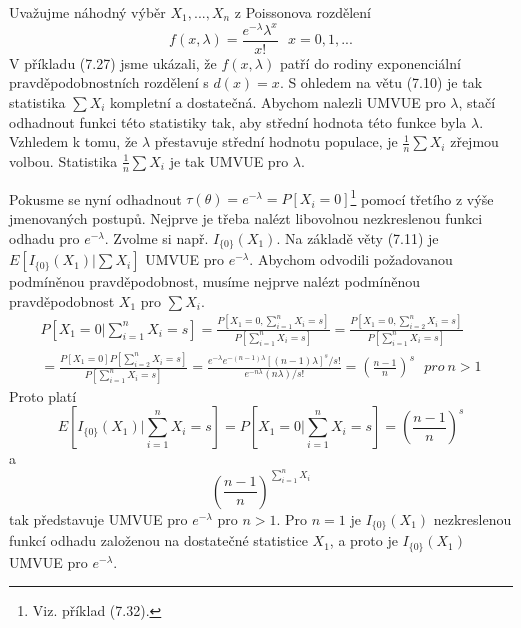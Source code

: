 \begin{example}
Uvažujme náhodný výběr $X_1, ..., X_n$ z Poissonova rozdělení
\begin{equation*}
f(x, \lambda) = \frac{e^{-\lambda}\lambda^x}{x!} ~~~ x = 0, 1, ...
\end{equation*}
V příkladu (7.27) jsme ukázali, že $f(x, \lambda)$ patří do rodiny exponenciální pravděpodobnostních rozdělení s $d(x) = x$. S ohledem na větu (7.10) je tak statistika $\sum X_i$ kompletní a dostatečná. Abychom nalezli UMVUE pro $\lambda$, stačí odhadnout funkci této statistiky tak, aby střední hodnota této funkce byla $\lambda$. Vzhledem k tomu, že $\lambda$ přestavuje střední hodnotu populace, je $\frac{1}{n}\sum X_i$ zřejmou volbou. Statistika $\frac{1}{n}\sum X_i$ je tak UMVUE pro $\lambda$.

Pokusme se nyní odhadnout $\tau(\theta) = e^{-\lambda} = P[X_i = 0]$\footnote{Viz. příklad (7.32).} pomocí třetího z výše jmenovaných postupů. Nejprve je třeba nalézt libovolnou nezkreslenou funkci odhadu pro $e^{-\lambda}$. Zvolme si např. $I_{\{0\}}(X_1)$. Na základě věty (7.11) je $E[I_{\{0\}}(X_1)| \sum X_i]$ UMVUE pro $e^{-\lambda}$. Abychom odvodili požadovanou podmíněnou pravděpodobnost, musíme nejprve nalézt podmíněnou pravděpodobnost $X_1$ pro $\sum X_i$.
\begin{gather*}
P\left[X_1 = 0 | \sum_{i = 1}^n X_i = s \right] = \frac{P\left[X_1 = 0, \sum_{i = 1}^n X_i = s\right]}{P \left[\sum_{i = 1}^n X_i = s \right]} = \frac{P \left[X_1 = 0, \sum_{i = 2}^n X_i = s \right]}{P \left[\sum_{i = 1}^n X_i = s \right]}\\
= \frac{P[X_1 = 0]P\left[\sum_{i = 2}^n X_i = s \right]}{P \left[\sum_{i = 1}^n X_i = s \right]} = \frac{e^{-\lambda}e^{-(n - 1)\lambda}[(n - 1) \lambda]^s / s!}{e^{-n \lambda}(n \lambda)/s!} = \left(\frac{n - 1}{n}\right)^s ~~~ \textit{pro} ~ n > 1
\end{gather*}
Proto platí
\begin{equation*}
E[I_{\{0\}}(X_1)|\sum_{i = 1}^n X_i = s] = P[X_1 = 0 | \sum_{i = 1}^n X_i = s] = \left(\frac{n - 1}{n}\right)^s
\end{equation*}
a
\begin{equation*}
\left(\frac{n - 1}{n}\right)^{\sum_{i = 1}^n X_i}
\end{equation*}
tak představuje UMVUE pro $e^{-\lambda}$ pro $n > 1$. Pro $n = 1$ je $I_{\{0\}}(X_1)$ nezkreslenou funkcí odhadu založenou na dostatečné statistice $X_1$, a proto je $I_{\{0\}}(X_1)$ UMVUE pro $e^{-\lambda}$.
\end{example}

